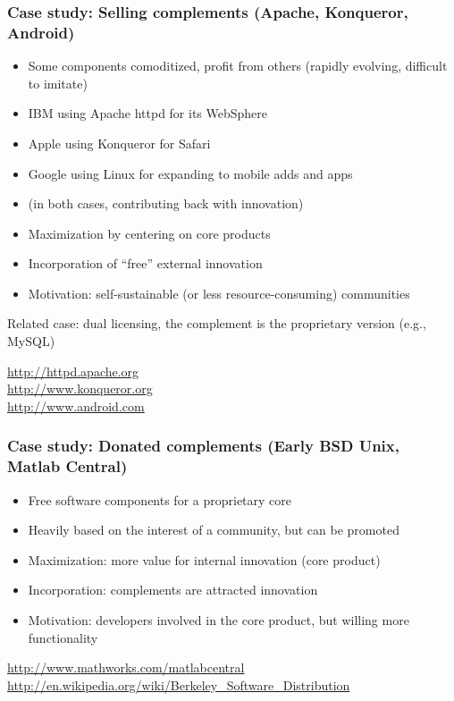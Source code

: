 \begin{frame}
\frametitle{Case study: Selling complements (Apache, Konqueror, Android)}

\begin{itemize}
\item Some components comoditized, profit from others (rapidly evolving, difficult to imitate)
\item IBM using Apache httpd for its WebSphere
\item Apple using Konqueror for Safari
\item Google using Linux for expanding to mobile adds and apps
\item (in both cases, contributing back with innovation)
\item Maximization by centering on core products
\item Incorporation of ``free'' external innovation
\item Motivation: self-sustainable (or less resource-consuming) communities
\end{itemize}

Related case: dual licensing, the complement is the proprietary version (e.g., MySQL)

\begin{flushright}
\url{http://httpd.apache.org} \\
\url{http://www.konqueror.org} \\
\url{http://www.android.com}
\end{flushright}

\end{frame}


\begin{frame}
\frametitle{Case study: Donated complements (Early BSD Unix, Matlab Central)}

\begin{itemize}
\item Free software components for a proprietary core
\item Heavily based on the interest of a community, but can be promoted
\item Maximization: more value for internal innovation (core product)
\item Incorporation: complements are attracted innovation
\item Motivation: developers involved in the core product, but willing more functionality
\end{itemize}

\begin{flushright}
\url{http://www.mathworks.com/matlabcentral}
\url{http://en.wikipedia.org/wiki/Berkeley_Software_Distribution}
\end{flushright}
\end{frame}

